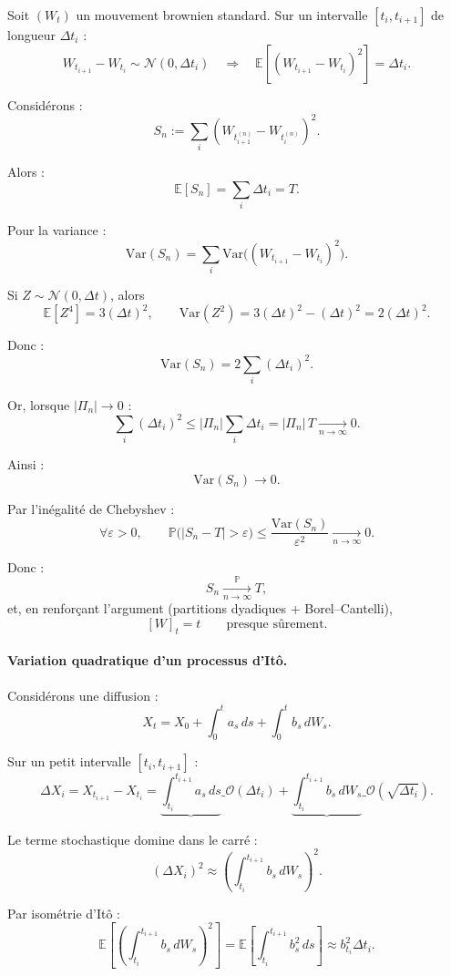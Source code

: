 \documentclass[11pt,a4paper]{article}
\newcommand{\1}{\mathbf{1}}
\begin{document}
Soit $(W_t)$ un mouvement brownien standard.
Sur un intervalle $[t_i,t_{i+1}]$ de longueur $\Delta t_i$ :
\[
W_{t_{i+1}} - W_{t_i} \sim \mathcal{N}(0,\Delta t_i)
\quad\Rightarrow\quad
\mathbb{E}[(W_{t_{i+1}} - W_{t_i})^2] = \Delta t_i.
\]

Considérons :
\[
S_n := \sum_i (W_{t^{(n)}_{i+1}} - W_{t^{(n)}_{i}})^2.
\]

Alors :
\[
\mathbb{E}[S_n] = \sum_i \Delta t_i = T.
\]

Pour la variance :
\[
\mathrm{Var}(S_n)
= \sum_i \mathrm{Var}\big( (W_{t_{i+1}} - W_{t_i})^2 \big).
\]

Si $Z \sim \mathcal{N}(0,\Delta t)$, alors
\[
\mathbb{E}[Z^4] = 3 (\Delta t)^2,
\qquad
\mathrm{Var}(Z^2) = 3(\Delta t)^2 - (\Delta t)^2 = 2(\Delta t)^2.
\]

Donc :
\[
\mathrm{Var}(S_n)
= 2 \sum_i (\Delta t_i)^2.
\]

Or, lorsque $|\Pi_n|\to 0$ :
\[
\sum_i (\Delta t_i)^2
\le |\Pi_n|\sum_i \Delta t_i
= |\Pi_n|\,T
\xrightarrow[n\to\infty]{} 0.
\]

Ainsi :
\[
\mathrm{Var}(S_n) \longrightarrow 0.
\]

Par l'inégalité de Chebyshev :
\[
\forall \varepsilon>0,\qquad
\mathbb{P}\big(|S_n - T| > \varepsilon\big)
\le \frac{\mathrm{Var}(S_n)}{\varepsilon^2}
\xrightarrow[n\to\infty]{} 0.
\]

Donc :
\[
S_n \xrightarrow[n\to\infty]{\mathbb{P}} T,
\]
et, en renforçant l'argument (partitions dyadiques + Borel--Cantelli),
\[
[W]_t = t
\qquad \text{presque sûrement}.
\]

\paragraph{Variation quadratique d'un processus d'It\^{o}.}

Considérons une diffusion :
\[
X_t = X_0 + \int_0^t a_s\, ds + \int_0^t b_s\, dW_s.
\]

Sur un petit intervalle $[t_i,t_{i+1}]$ :
\[
\Delta X_i
=
X_{t_{i+1}} - X_{t_i}
=
\underbrace{\int_{t_i}^{t_{i+1}} a_s\, ds}\_{\mathcal{O}(\Delta t_i)}
+
\underbrace{\int_{t_i}^{t_{i+1}} b_s\, dW_s}\_{\mathcal{O}(\sqrt{\Delta t_i})}.
\]

Le terme stochastique domine dans le carré :
\[
(\Delta X_i)^2
\approx
\left(\int_{t_i}^{t_{i+1}} b_s\, dW_s\right)^2.
\]

Par isométrie d'It\^{o} :
\[
\mathbb{E}\!\left[
\left(\int_{t_i}^{t_{i+1}} b_s\, dW_s\right)^2
\right]
=
\mathbb{E}\!\left[
\int_{t_i}^{t_{i+1}} b_s^2\, ds
\right]
\approx b_{t_i}^2 \Delta t_i.
\]
\end{document}
